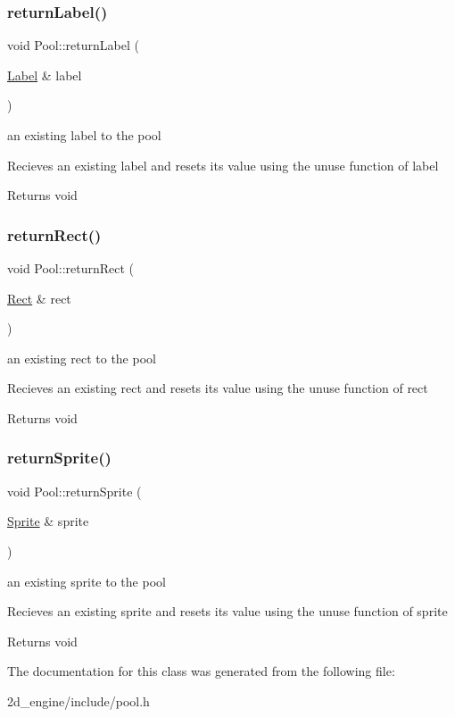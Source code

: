 \subsubsection{\texorpdfstring{return\+Label()}{returnLabel()}}
{\footnotesize\ttfamily void Pool\+::return\+Label (\begin{DoxyParamCaption}\item[{\hyperlink{class_label}{Label} \&}]{label }\end{DoxyParamCaption})}

an existing label to the pool

Recieves an existing label and resets it\textquotesingle{}s value using the unuse function of label

\begin{DoxyReturn}{Returns}
void 
\end{DoxyReturn}
\mbox{\label{class_pool_a3b5250c08babf163d9d4877c7a2a6f40}} 
\subsubsection{\texorpdfstring{return\+Rect()}{returnRect()}}
{\footnotesize\ttfamily void Pool\+::return\+Rect (\begin{DoxyParamCaption}\item[{\hyperlink{class_rect}{Rect} \&}]{rect }\end{DoxyParamCaption})}

an existing rect to the pool

Recieves an existing rect and resets it\textquotesingle{}s value using the unuse function of rect

\begin{DoxyReturn}{Returns}
void 
\end{DoxyReturn}
\mbox{\label{class_pool_a227334c0983a0c1bf42d72a44fcfee8f}} 
\subsubsection{\texorpdfstring{return\+Sprite()}{returnSprite()}}
{\footnotesize\ttfamily void Pool\+::return\+Sprite (\begin{DoxyParamCaption}\item[{\hyperlink{class_sprite}{Sprite} \&}]{sprite }\end{DoxyParamCaption})}

an existing sprite to the pool

Recieves an existing sprite and resets it\textquotesingle{}s value using the unuse function of sprite

\begin{DoxyReturn}{Returns}
void 
\end{DoxyReturn}


The documentation for this class was generated from the following file\+:\begin{DoxyCompactItemize}
\item 
2d\+\_\+engine/include/pool.\+h\end{DoxyCompactItemize}
